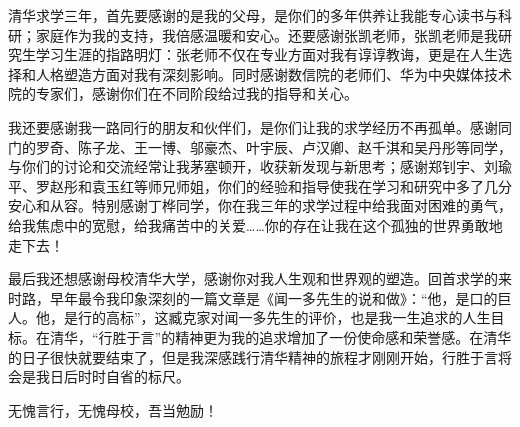 
\begin{acknowledgements}

清华求学三年，首先要感谢的是我的父母，是你们的多年供养让我能专心读书与科研；家庭作为我的支持，我倍感温暖和安心。还要感谢张凯老师，张凯老师是我研究生学习生涯的指路明灯：张老师不仅在专业方面对我有谆谆教诲，更是在人生选择和人格塑造方面对我有深刻影响。同时感谢数信院的老师们、华为中央媒体技术院的专家们，感谢你们在不同阶段给过我的指导和关心。

我还要感谢我一路同行的朋友和伙伴们，是你们让我的求学经历不再孤单。感谢同门的罗奇、陈子龙、王一博、邬豪杰、叶宇辰、卢汉卿、赵千淇和吴丹彤等同学，与你们的讨论和交流经常让我茅塞顿开，收获新发现与新思考；感谢郑钊宇、刘瑜平、罗赵彤和袁玉红等师兄师姐，你们的经验和指导使我在学习和研究中多了几分安心和从容。特别感谢丁桦同学，你在我三年的求学过程中给我面对困难的勇气，给我焦虑中的宽慰，给我痛苦中的关爱……你的存在让我在这个孤独的世界勇敢地走下去！

最后我还想感谢母校清华大学，感谢你对我人生观和世界观的塑造。回首求学的来时路，早年最令我印象深刻的一篇文章是《闻一多先生的说和做》：“他，是口的巨人。他，是行的高标”，这臧克家对闻一多先生的评价，也是我一生追求的人生目标。在清华，“行胜于言”的精神更为我的追求增加了一份使命感和荣誉感。在清华的日子很快就要结束了，但是我深感践行清华精神的旅程才刚刚开始，行胜于言将会是我日后时时自省的标尺。

无愧言行，无愧母校，吾当勉励！

\end{acknowledgements}
